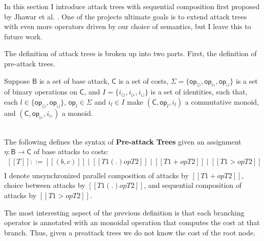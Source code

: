 In this section I introduce attack trees with sequential composition
first proposed by Jhawar et al. \cite{Jhawar:2015}.  One of the
projects ultimate goals is to extend attack trees with even more
operators driven by our choice of semantics, but I leave this to
future work.

The definition of attack trees is broken up into two parts.  First,
the definition of pre-attack trees.
\begin{definition}
  \label{def:atrees}
  Suppose $\mathsf{B}$ is a set of base attack, $\mathsf{C}$ is
  a set of costs, $\Sigma =
  \{\mathsf{op}_{\odot}, \mathsf{op}_\rhd, \mathsf{op}_\sqcup \}$ is a set of binary
  operations on $\mathsf{C}$, and $I = \{i_\odot, i_\rhd, i_\sqcup\}$ is a set of
  identities, such that, each $l \in \{ \mathsf{op}_{\odot}, \mathsf{op}_\sqcup \}$, $\mathsf{op}_l \in \Sigma$ and $i_l \in
  I$ make $(\mathsf{C}, \mathsf{op}_l, i_l)$ a commutative monoid, and
  $(\mathsf{C}, \mathsf{op}_\rhd, i_\rhd)$ a monoid.

  \ \\
  \noindent
  The following defines the syntax of \textbf{Pre-attack Trees} given an
  assignment $\eta : \mathsf{B} \to \mathsf{C}$ of base attacks
  to costs:
  \[
  \begin{array}{lll}
    [[T]] ::= [[(b, c)]] \mid [[T1 (.)op T2]] \mid [[T1 +op T2]] \mid [[T1 >op  T2]]\\
  \end{array}
  \]
  I denote unsynchronized parallel composition of attacks by $[[T1 +op
      T2]]$, choice between attacks by $[[T1 (.)op T2]]$, and sequential
  composition of attacks by $[[T1 >op T2]]$.  
\end{definition}
The most interesting aspect of the previous definition is that each
branching operator is annotated with an monoidal operation that
computes the cost at that branch.  Thus, given a preattack trees we do
not know the cost of the root node.

